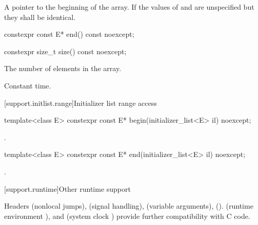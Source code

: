 \begin{itemdescr}
\pnum
\returns A pointer to the beginning of the array. If  the
values of  and  are unspecified but they shall be
identical.
\end{itemdescr}

\begin{itemdecl}
constexpr const E* end() const noexcept;
\end{itemdecl}

\begin{itemdescr}
\pnum
\returns {}
\end{itemdescr}

\begin{itemdecl}
constexpr size_t size() const noexcept;
\end{itemdecl}

\begin{itemdescr}
\pnum
\returns The number of elements in the array.

\pnum
\complexity Constant time.
\end{itemdescr}

[support.initlist.range]{Initializer list range access}

\begin{itemdecl}
template<class E> constexpr const E* begin(initializer_list<E> il) noexcept;
\end{itemdecl}

\begin{itemdescr}
\pnum
\returns {}.
\end{itemdescr}

\begin{itemdecl}
template<class E> constexpr const E* end(initializer_list<E> il) noexcept;
\end{itemdecl}

\begin{itemdescr}
\pnum
\returns {}.
\end{itemdescr}

[support.runtime]{Other runtime support}

\pnum
{}%
%
%
%
%
%
%
%
%
%
%
Headers
 (nonlocal jumps),
 (signal handling),
 (variable arguments),
 ().
 (runtime environment ),
and
 (system clock )
provide further compatibility with C code.

